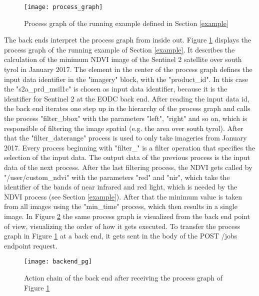\documentclass[draft,final]{vutinfth} %
\begin{document}
\begin{figure}[h]
	\centering
	\texttt{[image: process\_graph]}
	\caption{Process graph of the running example defined in Section \ref{example}}
	\label{fig:process_graph} %
\end{figure}

The back ends interpret the process graph from inside out. Figure \ref{fig:process_graph} displays the process graph of the running example of Section \ref{example}. It describes the calculation of the minimum NDVI image of the Sentinel 2 satellite over south tyrol in January 2017. The element in the center of the process graph defines the input data identifier in the "imagery" block, with the "product\_id". In this case the "s2a\_prd\_msil1c" is chosen  as input data identifier, because it is the identifier for Sentinel 2 at the EODC back end. After reading the input data id, the back end iterates one step up in the hierarchy of the process graph and calls the process "filter\_bbox" with the parameters "left", "right" and so on, which is responsible of filtering the image spatial (e.g. the area over south tyrol). After that the "filter\_daterange" process is used to only take imageries from January 2017. Every process beginning with "filter\_" is a filter operation that specifies the selection of the input data. The output data of the previous process is the input data of the next process. After the last filtering process, the NDVI gets called by "/user/custom\_ndvi" with the parameters "red" and "nir", which take the identifier of the bands of near infrared and red light, which is needed by the NDVI process (see Section \ref{example}). After that the minimum value is taken from all images using the "min\_time" process, which then results in a single image. In Figure \ref{fig:process_graph_diagram} the same process graph is visualized from the back end point of view, visualizing the order of how it gets executed. To transfer the process graph in Figure \ref{fig:process_graph} at a back end, it gets sent in the body of the POST /jobs endpoint request.

\begin{figure}[h]
	\centering
	\texttt{[image: backend\_pg]}
	\caption{Action chain of the back end after receiving the process graph of Figure \ref{fig:process_graph}}
	\label{fig:process_graph_diagram} %
\end{figure}
\end{document}
